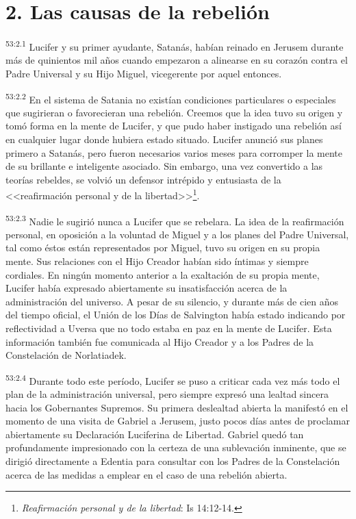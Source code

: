 \section*{2. Las causas de la rebelión}
\par
\textsuperscript{53:2.1} Lucifer y su primer ayudante, Satanás, habían reinado en Jerusem durante más de quinientos mil años cuando empezaron a alinearse en su corazón contra el Padre Universal y su Hijo Miguel, vicegerente por aquel entonces.

\par
\textsuperscript{53:2.2} En el sistema de Satania no existían condiciones particulares o especiales que sugirieran o favorecieran una rebelión. Creemos que la idea tuvo su origen y tomó forma en la mente de Lucifer, y que pudo haber instigado una rebelión así en cualquier lugar donde hubiera estado situado. Lucifer anunció sus planes primero a Satanás, pero fueron necesarios varios meses para corromper la mente de su brillante e inteligente asociado. Sin embargo, una vez convertido a las teorías rebeldes, se volvió un defensor intrépido y entusiasta de la <<reafirmación personal y de la libertad>>\footnote{\textit{Reafirmación personal y de la libertad}: Is 14:12-14.}.

\par
\textsuperscript{53:2.3} Nadie le sugirió nunca a Lucifer que se rebelara. La idea de la reafirmación personal, en oposición a la voluntad de Miguel y a los planes del Padre Universal, tal como éstos están representados por Miguel, tuvo su origen en su propia mente. Sus relaciones con el Hijo Creador habían sido íntimas y siempre cordiales. En ningún momento anterior a la exaltación de su propia mente, Lucifer había expresado abiertamente su insatisfacción acerca de la administración del universo. A pesar de su silencio, y durante más de cien años del tiempo oficial, el Unión de los Días de Salvington había estado indicando por reflectividad a Uversa que no todo estaba en paz en la mente de Lucifer. Esta información también fue comunicada al Hijo Creador y a los Padres de la Constelación de Norlatiadek.

\par
\textsuperscript{53:2.4} Durante todo este período, Lucifer se puso a criticar cada vez más todo el plan de la administración universal, pero siempre expresó una lealtad sincera hacia los Gobernantes Supremos. Su primera deslealtad abierta la manifestó en el momento de una visita de Gabriel a Jerusem, justo pocos días antes de proclamar abiertamente su Declaración Luciferina de Libertad. Gabriel quedó tan profundamente impresionado con la certeza de una sublevación inminente, que se dirigió directamente a Edentia para consultar con los Padres de la Constelación acerca de las medidas a emplear en el caso de una rebelión abierta.

